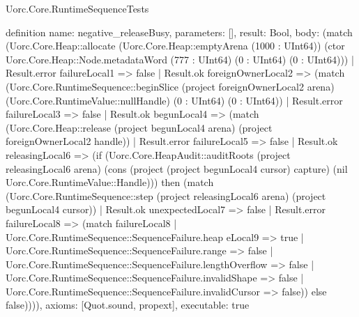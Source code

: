 \begin{lexlean}{Uorc.Core.RuntimeSequenceTests}
\begin{semanticmodule}
definition{
  name: negative_releaseBusy,
  parameters: [],
  result: Bool,
  body: (match (Uorc.Core.Heap::allocate (Uorc.Core.Heap::emptyArena (1000 : UInt64)) (ctor Uorc.Core.Heap::Node.metadataWord (777 : UInt64) (0 : UInt64) (0 : UInt64)))
    | Result.error failureLocal1 => false
    | Result.ok foreignOwnerLocal2 => (match (Uorc.Core.RuntimeSequence::beginSlice (project foreignOwnerLocal2 arena) (Uorc.Core.RuntimeValue::nullHandle) (0 : UInt64) (0 : UInt64))
      | Result.error failureLocal3 => false
      | Result.ok begunLocal4 => (match (Uorc.Core.Heap::release (project begunLocal4 arena) (project foreignOwnerLocal2 handle))
        | Result.error failureLocal5 => false
        | Result.ok releasingLocal6 => (if (Uorc.Core.HeapAudit::auditRoots (project releasingLocal6 arena) (cons (project (project begunLocal4 cursor) capture) (nil Uorc.Core.RuntimeValue::Handle))) then (match (Uorc.Core.RuntimeSequence::step (project releasingLocal6 arena) (project begunLocal4 cursor))
          | Result.ok unexpectedLocal7 => false
          | Result.error failureLocal8 => (match failureLocal8
            | Uorc.Core.RuntimeSequence::SequenceFailure.heap eLocal9 => true
            | Uorc.Core.RuntimeSequence::SequenceFailure.range => false
            | Uorc.Core.RuntimeSequence::SequenceFailure.lengthOverflow => false
            | Uorc.Core.RuntimeSequence::SequenceFailure.invalidShape => false
            | Uorc.Core.RuntimeSequence::SequenceFailure.invalidCursor => false)) else false)))),
  axioms: [Quot.sound, propext],
  executable: true
}


\end{semanticmodule}
\end{lexlean}
